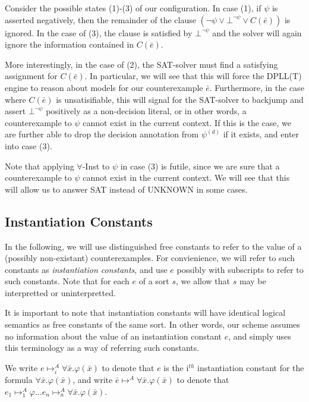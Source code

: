 \documentclass{llncs}
\begin{document}
Consider the possible states (1)-(3) of our configuration.
In case (1), if $\psi$ is asserted negatively, then the remainder of the clause $( \neg \psi \vee \bot^{\neg \psi} \vee C(\bar{e}))$ is ignored.
In the case of (3), the clause is satisfied by $\bot^{\neg \psi}$ and the solver will again ignore the information contained in $C(\bar{e})$.

More interestingly, in the case of (2), the SAT-solver must find a satisfying assignment for $C(\bar{e})$.
In particular, we will see that this will force the DPLL(T) engine to reason about models for our counterexample $\bar{e}$.
Furthermore, in the case where $C(\bar{e})$ is unsatisifiable, this will signal for the SAT-solver to backjump and assert $\bot^{\neg \psi}$ positively as a non-decision literal, or in other words, a counterexample to $\psi$ cannot exist in the current context.
If this is the case, we are further able to drop the decision annotation from $\psi^{(d)}$ if it exists, and enter into case (3).

Note that applying $\forall$-Inst to $\psi$ in case (3) is futile, since we are sure that a counterexample to $\psi$ cannot exist in the current context.
We will see that this will allow us to answer SAT instead of UNKNOWN in some cases.

\subsection{Instantiation Constants}

In the following, we will use distinguished free constants to refer to the value of a (possibly non-existant) counterexamples.
For convienience, we will refer to such constants as \emph{instantiation constants}, and use $e$ possibly with subscripts to refer to such constants.
Note that for each $e$ of a sort $s$, we allow that $s$ may be interpretted or uninterpretted.

It is important to note that instantiation constants will have identical logical semantics as free constants of the same sort.
In other words, our scheme assumes no information about the value of an instantiation constant $e$, and simply uses this terminology as a way of referring such constants.

We write $e \mapsto^A_i \forall \bar{x}. \varphi( \bar{x} )$ to denote that $e$ is the i$^{th}$ instantiation constant for the formula $\forall \bar{x}. \varphi( \bar{x} ) $, and write $\bar{e} \mapsto^A \forall \bar{x}. \varphi( \bar{x} )$ to denote that $e_1 \mapsto^A_1 \varphi \ldots e_n \mapsto^A_n \forall \bar{x}. \varphi( \bar{x} )$.
\end{document}
